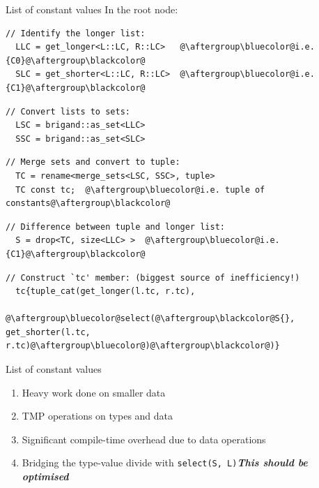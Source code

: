 \documentclass[xcolor=dvipsnames]{beamer}
\begin{document}
\begin{frame}[fragile]{List of constant values}
In the {\color{blue}root} node:
\begin{lstlisting}
// Identify the longer list:
  LLC = get_longer<L::LC, R::LC>   @\aftergroup\bluecolor@i.e. {C0}@\aftergroup\blackcolor@
  SLC = get_shorter<L::LC, R::LC>  @\aftergroup\bluecolor@i.e. {C1}@\aftergroup\blackcolor@
\end{lstlisting}
\begin{lstlisting}
// Convert lists to sets:
  LSC = brigand::as_set<LLC>
  SSC = brigand::as_set<SLC>
\end{lstlisting}
\begin{lstlisting}
// Merge sets and convert to tuple:
  TC = rename<merge_sets<LSC, SSC>, tuple>
  TC const tc;  @\aftergroup\bluecolor@i.e. tuple of constants@\aftergroup\blackcolor@
\end{lstlisting}
\begin{lstlisting}
// Difference between tuple and longer list:
  S = drop<TC, size<LLC> >  @\aftergroup\bluecolor@i.e. {C1}@\aftergroup\blackcolor@
\end{lstlisting}
\begin{lstlisting}
// Construct `tc' member: (biggest source of inefficiency!)
  tc{tuple_cat(get_longer(l.tc, r.tc),
               @\aftergroup\bluecolor@select(@\aftergroup\blackcolor@S{}, get_shorter(l.tc, r.tc)@\aftergroup\bluecolor@)@\aftergroup\blackcolor@)}
\end{lstlisting}
\end{frame}


\begin{frame}[fragile]{List of constant values}
  \begin{enumerate}
  \item Heavy work done on smaller data \vspace{5mm}
  \item TMP operations on types and data \vspace{5mm}
  \item Significant compile-time overhead due to data operations \vspace{5mm}
  \item Bridging the type-value divide with {\color{blue}\texttt{select(S, L)}}\newline \textbf{\emph{This should be optimised}} \vspace{5mm}
  \end{enumerate}
\end{frame}
\end{document}
